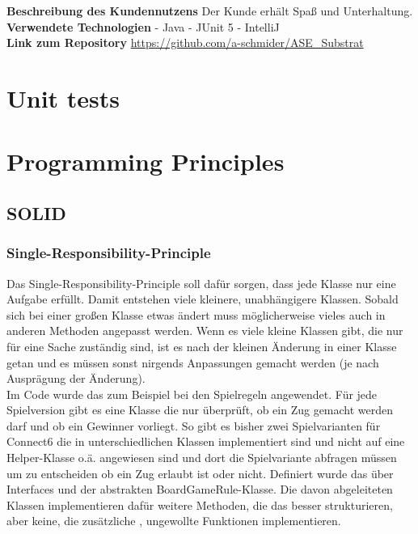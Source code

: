 \documentclass[12pt]{article}
\begin{document}
\noindent  \textbf{Beschreibung des Kundennutzens}
Der Kunde erhält Spaß und Unterhaltung.
\\

\noindent \textbf{Verwendete Technologien}
- Java
- JUnit 5
- IntelliJ
\\

\noindent \textbf{Link zum Repository}
\url{https://github.com/a-schmider/ASE_Substrat}

\newpage
\section{Unit tests}

\newpage
\section{Programming Principles}

\subsection{SOLID}

\subsubsection{Single-Responsibility-Principle}
Das Single-Responsibility-Principle soll dafür sorgen, dass jede Klasse nur eine Aufgabe erfüllt. Damit entstehen viele kleinere, unabhängigere Klassen. Sobald sich bei einer großen Klasse etwas ändert muss möglicherweise vieles auch in anderen Methoden angepasst werden. Wenn es viele kleine Klassen gibt, die nur für eine Sache zuständig sind, ist es nach der kleinen Änderung in einer Klasse getan und es müssen sonst nirgends Anpassungen gemacht werden (je nach Ausprägung der Änderung).
\\

Im Code wurde das zum Beispiel bei den Spielregeln angewendet. Für jede Spielversion gibt es eine Klasse die nur überprüft, ob ein Zug gemacht werden darf und ob ein Gewinner vorliegt. So gibt es bisher zwei Spielvarianten für Connect6 die in unterschiedlichen Klassen implementiert sind und nicht auf eine Helper-Klasse o.ä. angewiesen sind und dort die Spielvariante abfragen müssen um zu entscheiden ob ein Zug erlaubt ist oder nicht. Definiert wurde das über Interfaces und der abstrakten BoardGameRule-Klasse. Die davon abgeleiteten Klassen implementieren dafür weitere Methoden, die das besser strukturieren, aber keine, die zusätzliche , ungewollte Funktionen implementieren.
\end{document}
